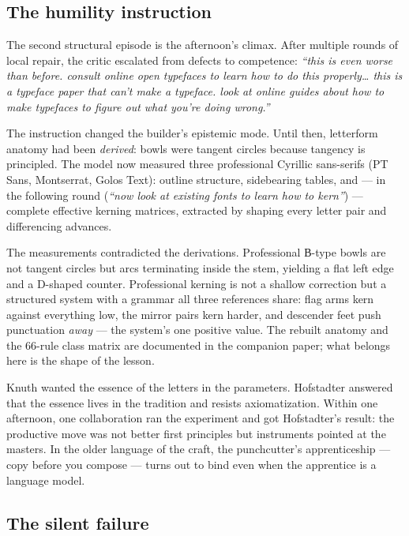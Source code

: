 \documentclass[12pt]{article}
\newcommand{\cz}[1]{{\chu #1}}
\begin{document}
\subsection{The humility instruction}\label{sec:masters}

The second structural episode is the afternoon's climax. After multiple rounds of local repair, the critic escalated from defects to competence: \emph{``this is even worse than before. consult online open typefaces to learn how to do this properly\ldots{} this is a typeface paper that can't make a typeface. look at online guides about how to make typefaces to figure out what you're doing wrong.''}

The instruction changed the builder's epistemic mode. Until then, letterform anatomy had been \emph{derived}: bowls were tangent circles because tangency is principled. The model now measured three professional Cyrillic sans-serifs (PT Sans, Montserrat, Golos Text): outline structure, sidebearing tables, and — in the following round (\emph{``now look at existing fonts to learn how to kern''}) — complete effective kerning matrices, extracted by shaping every letter pair and differencing advances.

The measurements contradicted the derivations. Professional \cz{В}-type bowls are not tangent circles but arcs terminating inside the stem, yielding a flat left edge and a D-shaped counter. Professional kerning is not a shallow correction but a structured system with a grammar all three references share: flag arms kern against everything low, the mirror pairs kern harder, and descender feet push punctuation \emph{away} — the system's one positive value. The rebuilt anatomy and the 66-rule class matrix are documented in the companion paper; what belongs here is the shape of the lesson.

Knuth wanted the essence of the letters in the parameters. Hofstadter answered that the essence lives in the tradition and resists axiomatization. Within one afternoon, one collaboration ran the experiment and got Hofstadter's result: the productive move was not better first principles but instruments pointed at the masters. In the older language of the craft, the punchcutter's apprenticeship — copy before you compose — turns out to bind even when the apprentice is a language model.

\subsection{The silent failure}
\end{document}
